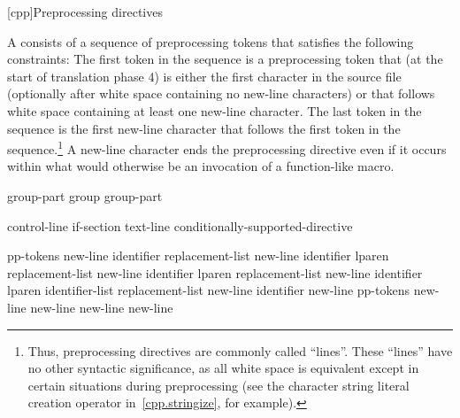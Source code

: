 [cpp]{Preprocessing directives}%

%
%


\pnum
A  consists of a sequence of preprocessing tokens
that satisfies the following constraints:
The first token in the sequence is a
\tcode{\#}
preprocessing token that (at the start of translation phase 4)
is either the first character in the source file
(optionally after white space containing no new-line characters)
or that follows white space containing at least one new-line character.
The last token in the sequence is the first new-line character
that follows the first token in the sequence.\footnote{Thus,
preprocessing directives are commonly called ``lines''.
These ``lines'' have no other syntactic significance,
as all white space is equivalent except in certain situations
during preprocessing (see the
\tcode{\#}
character string literal creation operator in~\ref{cpp.stringize}, for example).}
A new-line character ends the preprocessing directive even if it occurs
within what would otherwise be an invocation of a function-like macro.

\begin{bnf}
\br
\end{bnf}

\begin{bnf}
\br
    group-part\br
    group group-part
\end{bnf}

\begin{bnf}
\br
    control-line\br
    if-section\br
    text-line\br
    \terminal{\#} conditionally-supported-directive
\end{bnf}

\begin{bnf}\obeyspaces
{}\br
     pp-tokens new-line\br
     identifier replacement-list new-line\br
     identifier lparen  \terminal{)} replacement-list new-line\br
     identifier lparen  replacement-list new-line\br
     identifier lparen identifier-list  replacement-list new-line\br
     identifier new-line\br
     pp-tokens new-line\br
      new-line\br
      new-line\br
    \terminal{\# }new-line
\end{bnf}

